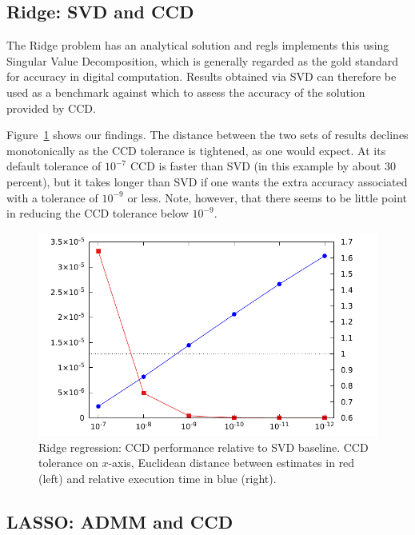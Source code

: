 \documentclass{article}
\begin{document}
\subsection*{Ridge: SVD and CCD}

The Ridge problem has an analytical solution and \textsf{regls}
implements this using Singular Value Decomposition, which is generally
regarded as the gold standard for accuracy in digital
computation. Results obtained via SVD can therefore be used as a
benchmark against which to assess the accuracy of the solution
provided by CCD.

Figure~\ref{fig:ccd-svd} shows our findings. The distance between the
two sets of results declines monotonically as the CCD tolerance is
tightened, as one would expect. At its default tolerance of $10^{-7}$
CCD is faster than SVD (in this example by about 30 percent), but it
takes longer than SVD if one wants the extra accuracy associated with
a tolerance of $10^{-9}$ or less. Note, however, that there seems to
be little point in reducing the CCD tolerance below $10^{-9}$.

\begin{figure}[htbp]
\begin{center}
\includegraphics[scale=0.9]{ccd_svd.pdf}
\caption{Ridge regression: CCD performance relative to SVD
  baseline. CCD tolerance on $x$-axis, Euclidean distance between
  estimates in red (left) and relative execution time in blue
  (right).}
\label{fig:ccd-svd}
\end{center}
\end{figure}

\subsection*{LASSO: ADMM and CCD}
\end{document}
